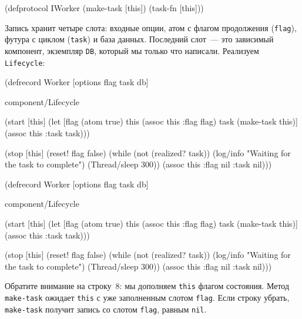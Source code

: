 \begin{english}
  \begin{clojure}
(defprotocol IWorker
  (make-task [this])
  (task-fn [this]))
  \end{clojure}
\end{english}

Запись хранит четыре слота: входные опции, атом с флагом продолжения
(\verb|flag|), футура с циклом (\verb|task|) и база данных. Последний слот~---
это зависимый компонент, экземпляр \verb|DB|, который мы только что
написали. Реализуем \verb|Lifecycle|:

\ifnarrow

\begin{english}
  \begin{clojure/lines}
(defrecord Worker
  [options flag task db]

  component/Lifecycle

  (start [this]
    (let [flag (atom true)
          this (assoc this :flag flag)
          task (make-task this)]
      (assoc this :task task)))

  (stop [this]
    (reset! flag false)
    (while (not (realized? task))
      (log/info
        "Waiting for
             the task to complete")
      (Thread/sleep 300))
    (assoc this :flag nil :task nil)))
  \end{clojure/lines}
\end{english}

\else

\begin{english}
  \begin{clojure/lines}
(defrecord Worker
  [options flag task db]

  component/Lifecycle

  (start [this]
    (let [flag (atom true)
          this (assoc this :flag flag)
          task (make-task this)]
      (assoc this :task task)))

  (stop [this]
    (reset! flag false)
    (while (not (realized? task))
      (log/info "Waiting for the task to complete")
      (Thread/sleep 300))
    (assoc this :flag nil :task nil)))
  \end{clojure/lines}
\end{english}

\fi

Обратите внимание на строку~8: мы дополняем \verb|this| флагом состояния. Метод
\verb|make-task| ожидает \verb|this| с уже заполненным слотом \verb|flag|. Если
строку убрать, \verb|make-task| получит запись со слотом \verb|flag|, равным
\verb|nil|.

